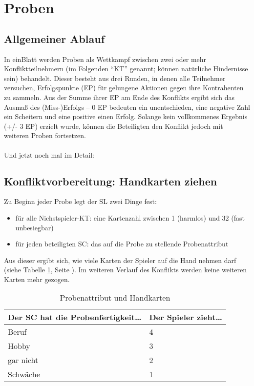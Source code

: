 \section {Proben}
\subsection {Allgemeiner Ablauf}
In einBlatt werden Proben als Wettkampf zwischen zwei oder mehr Konfliktteilnehmern (im Folgenden "`KT"' genannt; können natürliche Hindernisse sein) behandelt. Dieser besteht aus drei Runden, in denen alle Teilnehmer versuchen, Erfolgspunkte (EP) für gelungene Aktionen gegen ihre Kontrahenten zu sammeln. Aus der Summe ihrer EP am Ende des Konflikts ergibt sich das Ausmaß des (Miss-)Erfolgs -- 0 EP bedeuten ein unentschieden, eine negative Zahl ein Scheitern und eine positive einen Erfolg. Solange kein vollkommenes Ergebnis (+/- 3 EP) erzielt wurde, können die Beteiligten den Konflikt jedoch mit weiteren Proben fortsetzen.
\\
\\
Und jetzt noch mal im Detail:
\subsection {Konfliktvorbereitung: Handkarten ziehen}
Zu Beginn jeder Probe legt der SL zwei Dinge fest:
\begin{itemize}
\item für alle Nichstspieler-KT: eine Kartenzahl zwischen 1 (harmlos) und 32 (fast unbesiegbar)
\item für jeden beteiligten SC: das auf die Probe zu stellende Probenattribut
\end{itemize}
Aus dieser ergibt sich, wie viele Karten der Spieler auf die Hand nehmen darf (siehe Tabelle \ref {tab:probenattributundhandkarten}, Seite \pageref {tab:probenattributundhandkarten}). Im weiteren Verlauf des Konflikts werden keine weiteren Karten mehr gezogen.

\begin{table}[H]
\caption{Probenattribut und Handkarten}
\label{tab:probenattributundhandkarten}
\begin{tabular}{|l|l|}
\hline
Der SC hat die Probenfertigkeit\dots & Der Spieler zieht\dots \\
\hline
Beruf & 4 \\
Hobby & 3 \\
gar nicht & 2 \\
Schwäche & 1 \\
\hline
\end{tabular}
\end{table}

